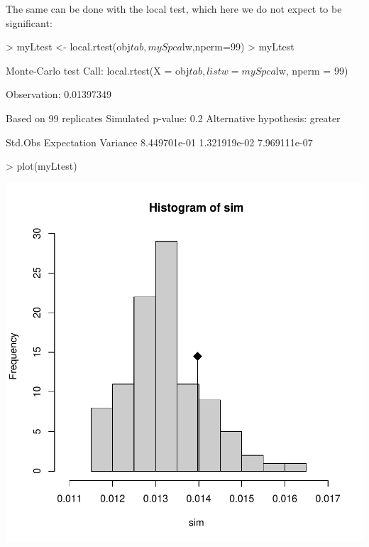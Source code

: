 \documentclass{article}
\begin{document}
The same can be done with the local test, which here we do not expect
to be significant:
\begin{Schunk}
\begin{Sinput}
> myLtest <- local.rtest(obj$tab,mySpca$lw,nperm=99)
> myLtest
\end{Sinput}
\begin{Soutput}
Monte-Carlo test
Call: local.rtest(X = obj$tab, listw = mySpca$lw, nperm = 99)

Observation: 0.01397349 

Based on 99 replicates
Simulated p-value: 0.2 
Alternative hypothesis: greater 

     Std.Obs  Expectation     Variance 
8.449701e-01 1.321919e-02 7.969111e-07 
\end{Soutput}
\begin{Sinput}
> plot(myLtest)
\end{Sinput}
\end{Schunk}
\includegraphics{spca-localrtest}
~\\
\end{document}
